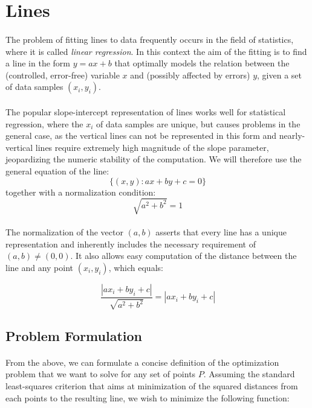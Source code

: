 \section{Lines}

\paragraph*{}
The problem of fitting lines to data frequently occurs in the field of statistics, where it is called \textit{linear regression}. In this context the aim of the fitting is to find a line in the form $y = ax + b$ that optimally models the relation between the (controlled, error-free) variable $x$ and (possibly affected by errors) $y$, given a set of data samples $(x_i, y_i)$. 

\paragraph*{}
The popular slope-intercept representation of lines works well for statistical regression, where the $x_i$ of data samples are unique, but causes problems in the general case, as the vertical lines can not be represented in this form and nearly-vertical lines require extremely high magnitude of the slope parameter, jeopardizing the numeric stability of the computation. We will therefore use the general equation of the line:
\[
	\{(x,y): ax + by + c = 0\}
\]
together with a normalization condition:
\[
	\sqrt{a^2 + b^2} = 1 
\]

\paragraph*{}
The normalization of the vector $(a,b)$ asserts that every line has a unique representation and inherently includes the necessary requirement of $(a,b) \neq (0,0)$. It also allows easy computation of the distance between the line and any point $(x_i,y_i)$, which equals:

\[
	\frac{|ax_i + by_i + c|}{\sqrt{a^2 + b^2}} = |ax_i + by_i + c|
\]

\subsection{Problem Formulation}

\paragraph*{}
From the above, we can formulate a concise definition of the optimization problem that we want to solve for any set of points $P$. Assuming the standard least-squares criterion that aims at minimization of the squared distances from each points to the resulting line, we wish to minimize the following function:

